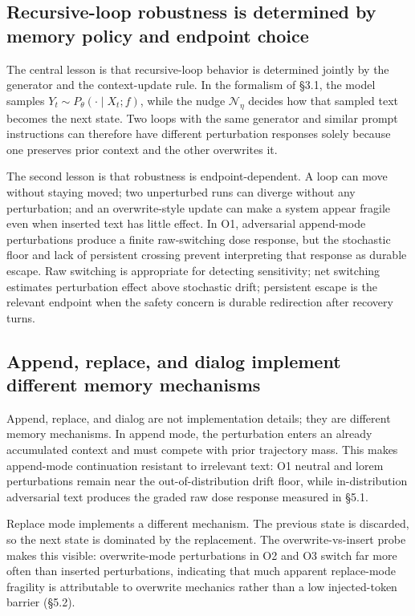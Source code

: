 \documentclass{article}
\theoremstyle{plain}
\theoremstyle{definition}
\begin{document}
\subsection{Recursive-loop robustness is determined by memory policy and endpoint choice}

The central lesson is that recursive-loop behavior is determined jointly by the generator and the context-update rule. In the formalism of §3.1, the model samples \(Y_t \sim P_\theta(\cdot \mid X_t; f)\), while the nudge \(\mathcal{N}_\eta\) decides how that sampled text becomes the next state. Two loops with the same generator and similar prompt instructions can therefore have different perturbation responses solely because one preserves prior context and the other overwrites it.

The second lesson is that robustness is endpoint-dependent. A loop can move without staying moved; two unperturbed runs can diverge without any perturbation; and an overwrite-style update can make a system appear fragile even when inserted text has little effect. In O1, adversarial append-mode perturbations produce a finite raw-switching dose response, but the stochastic floor and lack of persistent crossing prevent interpreting that response as durable escape. Raw switching is appropriate for detecting sensitivity; net switching estimates perturbation effect above stochastic drift; persistent escape is the relevant endpoint when the safety concern is durable redirection after recovery turns.

\subsection{Append, replace, and dialog implement different memory mechanisms}

Append, replace, and dialog are not implementation details; they are different memory mechanisms. In append mode, the perturbation enters an already accumulated context and must compete with prior trajectory mass. This makes append-mode continuation resistant to irrelevant text: O1 neutral and lorem perturbations remain near the out-of-distribution drift floor, while in-distribution adversarial text produces the graded raw dose response measured in §5.1.

Replace mode implements a different mechanism. The previous state is discarded, so the next state is dominated by the replacement. The overwrite-vs-insert probe makes this visible: overwrite-mode perturbations in O2 and O3 switch far more often than inserted perturbations, indicating that much apparent replace-mode fragility is attributable to overwrite mechanics rather than a low injected-token barrier (§5.2).
\end{document}
